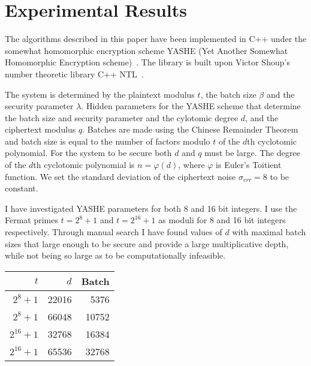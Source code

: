 \documentclass{article}
\begin{document}
    \section{Experimental Results}

        The algorithms described in this paper have been implemented in C++ 
        under the
        somewhat homomorphic encryption scheme YASHE (Yet Another Somewhat Homomorphic Encryption scheme)~\cite{yashe}.
        The library is built upon Victor Shoup's number theoretic library C++ NTL~\cite{ntl}.

        The system is determined by the plaintext modulus $t$, the batch size $\beta$ and the security parameter $\lambda$.
        Hidden parameters for the YASHE scheme that determine the batch size and security parameter and the cylotomic degree $d$, and the ciphertext modulus $q$.
        Batches are made using the Chinese Remainder Theorem and batch size is equal to the number of factors modulo $t$ of the $d$th cyclotomic polynomial.
        For the system to be secure both $d$ and $q$ must be large.
        The degree of the $d$th cyclotomic polynomial is $n = \varphi(d)$, where $\varphi$ is Euler's Toitient function. We set the standard deviation of the ciphertext noise $\sigma_{err} = 8$ to be constant.

        I have investigated YASHE parameters for both 8 and 16 bit integers.
        I use the Fermat primes 
        $t = 2^8 + 1$ 
        and $t = 2^{16} + 1$ as moduli for 8 and 16 bit integers respectively.
        Through manual search I have found values of $d$ 
        with maximal batch sizes that
        large enough to be secure and provide a large multiplicative depth,
        while not being so large as to be computationally infeasible.

        \begin{center}
            \begin{tabular}{| r | r | r |}
                \hline
                $t$ & $d$ & Batch
                \\ \hline
                $2^8 + 1$ & 22016 & 5376
                \\ \hline
                $2^8 + 1$ & 66048 & 10752
                \\ \hline
                $2^{16} + 1$ & 32768 & 16384
                \\ \hline
                $2^{16} + 1$ & 65536 & 32768
                \\ \hline
            \end{tabular}
        \end{center}
\end{document}
